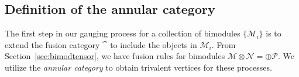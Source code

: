 
\subsection{Definition of the annular category}

%
The first step in our gauging process for a collection of bimodules $\{\mathcal{M}_i\}$ is to extend the fusion category $\cat$ to include the objects in $\mathcal{M}_i$. From Section~\ref{sec:bimodtensor}, we have fusion rules for bimodules $\mathcal{M}\otimes\mathcal{N}=\oplus\mathcal{P}$. We utilize the \emph{annular category} to obtain trivalent vertices for these processes. 

